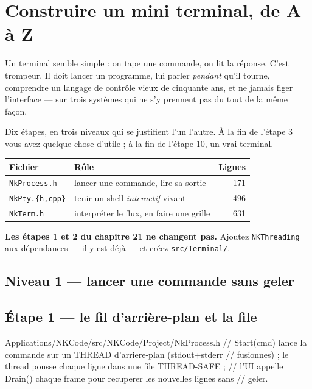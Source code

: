 \chapter{Construire un mini terminal, de A à Z}

Un terminal semble simple : on tape une commande, on lit la réponse. C'est
trompeur. Il doit lancer un programme, lui parler \emph{pendant} qu'il tourne,
comprendre un langage de contrôle vieux de cinquante ans, et ne jamais figer
l'interface --- sur trois systèmes qui ne s'y prennent pas du tout de la même
façon.

Dix étapes, en trois niveaux qui se justifient l'un l'autre. À la fin de
l'étape 3 vous avez quelque chose d'utile ; à la fin de l'étape 10, un vrai
terminal.

\begin{center}
\begin{tabular}{@{}llr@{}}
\toprule
\textbf{Fichier} & \textbf{Rôle} & \textbf{Lignes} \\
\midrule
\texttt{NkProcess.h} & lancer une commande, lire sa sortie & 171 \\
\texttt{NkPty.\{h,cpp\}} & tenir un shell \emph{interactif} vivant & 496 \\
\texttt{NkTerm.h} & interpréter le flux, en faire une grille & 631 \\
\bottomrule
\end{tabular}
\end{center}

\begin{nkretenir}
\textbf{Les étapes 1 et 2 du chapitre 21 ne changent pas.} Ajoutez
\texttt{NKThreading} aux dépendances --- il y est déjà --- et créez
\texttt{src/Terminal/}.
\end{nkretenir}

\section*{Niveau 1 --- lancer une commande sans geler}

\section{Étape 1 --- le fil d'arrière-plan et la file}

\begin{nkcode}{Applications/NKCode/src/NKCode/Project/NkProcess.h}
//   Start(cmd) lance la commande sur un THREAD d'arriere-plan (stdout+stderr
//   fusionnes) ; le thread pousse chaque ligne dans une file THREAD-SAFE ;
//   l'UI appelle Drain() chaque frame pour recuperer les nouvelles lignes sans
//   geler.
\end{nkcode}


